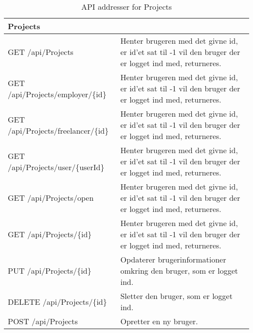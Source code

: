 \begin{table}[H]
	\centering
	\caption{API addresser for Projects}
	\label{tab:web_user}
	\begin{tabular}{p{5cm}|p{11cm}}
		\hline
		\multicolumn{2}{l}{\textbf{Projects}}\\
		\hline
		GET \newline
		/api/Projects &
		Henter brugeren med det givne id, er id'et sat til -1 vil den bruger der er logget ind med, returneres. \\
        \hline
        GET \newline
		/api/Projects/employer/\{id\} &
		Henter brugeren med det givne id, er id'et sat til -1 vil den bruger der er logget ind med, returneres. \\
        \hline
        GET \newline
		/api/Projects/freelancer/\{id\} &
		Henter brugeren med det givne id, er id'et sat til -1 vil den bruger der er logget ind med, returneres. \\
        \hline
        GET \newline
		/api/Projects/user/\{userId\} &
		Henter brugeren med det givne id, er id'et sat til -1 vil den bruger der er logget ind med, returneres. \\
        \hline
        GET \newline
		/api/Projects/open &
		Henter brugeren med det givne id, er id'et sat til -1 vil den bruger der er logget ind med, returneres. \\
        \hline
        GET \newline
		/api/Projects/\{id\} &
		Henter brugeren med det givne id, er id'et sat til -1 vil den bruger der er logget ind med, returneres. \\
		\hline
		PUT \newline
		/api/Projects/\{id\} &
		Opdaterer brugerinformationer omkring den bruger, som er logget ind. \\
		\hline
		DELETE \newline
		/api/Projects/\{id\} &
		Sletter den bruger, som er logget ind. \\
		\hline
		POST \newline
		/api/Projects &
		Opretter en ny bruger. \\
		\hline
	\end{tabular}
\end{table}

